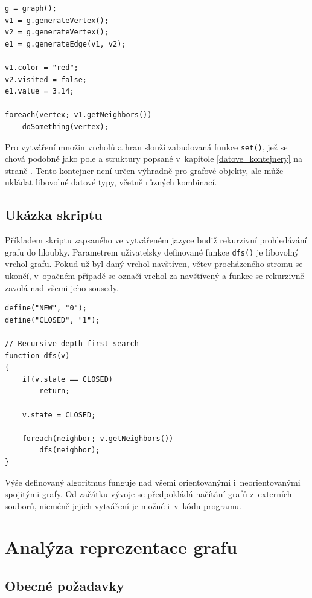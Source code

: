 \documentclass[11pt,twoside,a4paper]{book}
\begin{document}
\begin{verbatim}
g = graph();
v1 = g.generateVertex();
v2 = g.generateVertex();
e1 = g.generateEdge(v1, v2);

v1.color = "red";
v2.visited = false;
e1.value = 3.14;

foreach(vertex; v1.getNeighbors())
    doSomething(vertex);
\end{verbatim}

Pro vytváření množin vrcholů a hran slouží zabudovaná funkce \texttt{set()}, jež se chová podobně jako pole a struktury popsané v~kapitole \ref{datove_kontejnery} na straně \pageref{datove_kontejnery}. Tento kontejner není určen výhradně pro grafové objekty, ale může ukládat libovolné datové typy, včetně různých kombinací.


\subsection{Ukázka skriptu}

Příkladem skriptu zapsaného ve vytvářeném jazyce budiž rekurzivní pro\-hle\-dá\-vá\-ní grafu do hloubky. Parametrem uživatelsky definované funkce \texttt{dfs()} je libovolný vrchol grafu. Pokud už byl daný vrchol navštíven, větev procházeného stromu se ukončí, v~opačném případě se označí vrchol za navštívený a funkce se rekurzivně zavolá nad všemi jeho sousedy.

\begin{verbatim}
define("NEW", "0");
define("CLOSED", "1");

// Recursive depth first search
function dfs(v)
{
    if(v.state == CLOSED)
        return;

    v.state = CLOSED;

    foreach(neighbor; v.getNeighbors())
        dfs(neighbor);
}
\end{verbatim}

Výše definovaný algoritmus funguje nad všemi orientovanými i~neorientovanými spojitými grafy. Od začátku vývoje se předpokládá načítání grafů z~externích souborů, nicméně jejich vytváření je možné i~v~kódu programu.


\section{Analýza reprezentace grafu}

\subsection{Obecné požadavky}
\end{document}
